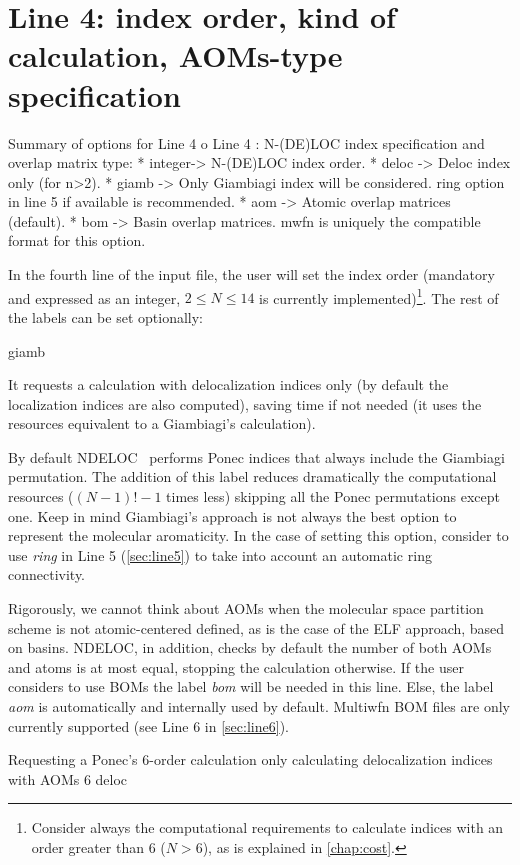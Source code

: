 \documentclass[a4paper,11pt,openany]{memoir}
\newcommand\programa{\textsc{NDELOC}}
\begin{document}
\section[Line 4: index order, kind of calculation, \acsp{AOM}-type specification]{Line 4: index order, kind of calculation, \acp{AOM}-type specification}\label{sec:line4}
\begin{recuadro}{Summary of options for Line 4}
o Line 4 :  N-(DE)LOC index specification and overlap matrix type:
 *  integer-> N-(DE)LOC index order.
 *  deloc  -> Deloc index only (for n>2).
 *  giamb  -> Only Giambiagi index will be considered.
              ring option in line 5 if available is recommended.
 *  aom    -> Atomic overlap matrices (default).
 *  bom    -> Basin  overlap matrices. mwfn is uniquely the compatible format
              for this option.
\end{recuadro}
In the fourth line of the input file, the user will set the index order (mandatory and expressed as an integer, $2\le N\le 14$ is currently implemented)\footnote{Consider always the computational requirements to calculate indices with an order greater than 6 ($N>6$), as is explained in \autoref{chap:cost}.}. The rest of the labels can be set optionally:
\begin{labeling}{giamb}
	\item[deloc] It requests a calculation with delocalization indices only (by default the localization indices are also computed), saving time if not needed (it uses the resources equivalent to a Giambiagi's calculation).
	\item[giamb] By default \programa~ performs Ponec indices that always include the Giambiagi permutation. The addition of this label reduces dramatically the computational resources ($(N-1)!-1$ times less) skipping all the Ponec permutations except one. Keep in mind Giambiagi's approach is not always the best option to represent the molecular aromaticity. In the case of setting this option, consider to use \emph{ring} in Line 5 (\autoref{sec:line5}) to take into account an automatic ring connectivity.
	\item[\ac{AOM}] Rigorously, we cannot think about \acfp{AOM} when the molecular space partition scheme is not atomic-centered defined, as is the case of the \ac{ELF} approach, based on basins. \programa, in addition, checks by default the number of both \acp{AOM} and atoms is at most equal, stopping the calculation otherwise. If the user considers to use \acp{BOM} the label \emph{bom} will be needed in this line. Else, the label \emph{aom} is automatically and internally used by default. Multiwfn \ac{BOM} files are only currently supported (see Line 6 in \autoref{sec:line6}).
\end{labeling}
\begin{myexample}{Requesting a Ponec's 6-order calculation only calculating delocalization indices with \acp{AOM}}
	6 deloc
\end{myexample}
\end{document}
